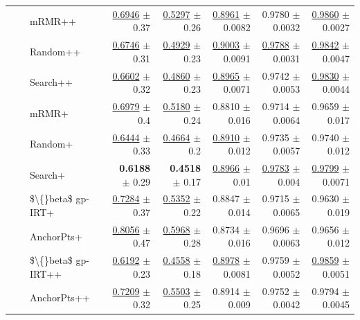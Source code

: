 \begin{longtable}{llp{}rrrrr}
 &  & mRMR++ & \underline{0.6946} {\scriptsize $\pm$ 0.37} & \underline{0.5297} {\scriptsize $\pm$ 0.26} & \underline{0.8961} {\scriptsize $\pm$ 0.0082} & 0.9780 {\scriptsize $\pm$ 0.0032} & \underline{0.9860} {\scriptsize $\pm$ 0.0027} \\
 &  & Random++ & \underline{0.6746} {\scriptsize $\pm$ 0.31} & \underline{0.4929} {\scriptsize $\pm$ 0.23} & \underline{0.9003} {\scriptsize $\pm$ 0.0091} & \underline{0.9788} {\scriptsize $\pm$ 0.0031} & \underline{0.9842} {\scriptsize $\pm$ 0.0047} \\
 &  & Search++ & \underline{0.6602} {\scriptsize $\pm$ 0.32} & \underline{0.4860} {\scriptsize $\pm$ 0.23} & \underline{0.8965} {\scriptsize $\pm$ 0.0071} & 0.9742 {\scriptsize $\pm$ 0.0053} & \underline{0.9830} {\scriptsize $\pm$ 0.0044} \\
 &  & mRMR+ & \underline{0.6979} {\scriptsize $\pm$ 0.4} & \underline{0.5180} {\scriptsize $\pm$ 0.24} & 0.8810 {\scriptsize $\pm$ 0.016} & 0.9714 {\scriptsize $\pm$ 0.0064} & 0.9659 {\scriptsize $\pm$ 0.017} \\
 &  & Random+ & \underline{0.6444} {\scriptsize $\pm$ 0.33} & \underline{0.4664} {\scriptsize $\pm$ 0.2} & \underline{0.8910} {\scriptsize $\pm$ 0.012} & 0.9735 {\scriptsize $\pm$ 0.0057} & 0.9740 {\scriptsize $\pm$ 0.012} \\
 &  & Search+ & \textbf{0.6188} {\scriptsize $\pm$ 0.29} & \textbf{0.4518} {\scriptsize $\pm$ 0.17} & \underline{0.8966} {\scriptsize $\pm$ 0.01} & \underline{0.9783} {\scriptsize $\pm$ 0.004} & \underline{0.9799} {\scriptsize $\pm$ 0.0071} \\
 &  & \$\textbackslash\{\}beta\$ gp-IRT+ & \underline{0.7284} {\scriptsize $\pm$ 0.37} & \underline{0.5352} {\scriptsize $\pm$ 0.22} & 0.8847 {\scriptsize $\pm$ 0.014} & 0.9715 {\scriptsize $\pm$ 0.0065} & 0.9630 {\scriptsize $\pm$ 0.019} \\
 &  & AnchorPts+ & \underline{0.8056} {\scriptsize $\pm$ 0.47} & \underline{0.5968} {\scriptsize $\pm$ 0.28} & 0.8734 {\scriptsize $\pm$ 0.016} & 0.9696 {\scriptsize $\pm$ 0.0063} & 0.9656 {\scriptsize $\pm$ 0.012} \\
 &  & \$\textbackslash\{\}beta\$ gp-IRT++ & \underline{0.6192} {\scriptsize $\pm$ 0.23} & \underline{0.4558} {\scriptsize $\pm$ 0.18} & \underline{0.8978} {\scriptsize $\pm$ 0.0081} & 0.9759 {\scriptsize $\pm$ 0.0052} & \underline{0.9859} {\scriptsize $\pm$ 0.0051} \\
 &  & AnchorPts++ & \underline{0.7209} {\scriptsize $\pm$ 0.32} & \underline{0.5503} {\scriptsize $\pm$ 0.25} & 0.8914 {\scriptsize $\pm$ 0.009} & 0.9752 {\scriptsize $\pm$ 0.0042} & 0.9794 {\scriptsize $\pm$ 0.0045} \\

\end{longtable}
